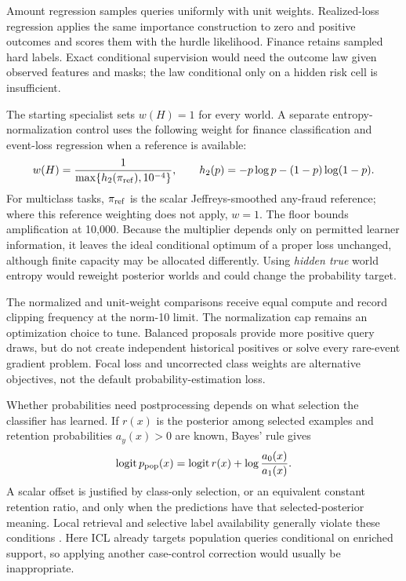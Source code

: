 \documentclass[11pt]{article}
\begin{document}
Amount regression samples queries uniformly with unit weights. Realized-loss regression applies the same importance construction to zero and positive outcomes and scores them with the hurdle likelihood. Finance retains sampled hard labels. Exact conditional supervision would need the outcome law given observed features and masks; the law conditional only on a hidden risk cell is insufficient.

The starting specialist sets $w(H)=1$ for every world. A separate entropy-normalization control uses the following weight for finance classification and event-loss regression when a reference is available:
\[
w(H)=\frac{1}{\max\{h_2(\pi_{\rm ref}),10^{-4}\}},\qquad
h_2(p)=-p\log p-(1-p)\log(1-p).
\]
For multiclass tasks, $\pi_{\rm ref}$ is the scalar Jeffreys-smoothed any-fraud reference; where this reference weighting does not apply, $w=1$. The floor bounds amplification at 10,000. Because the multiplier depends only on permitted learner information, it leaves the ideal conditional optimum of a proper loss unchanged, although finite capacity may be allocated differently. Using \emph{hidden true} world entropy would reweight posterior worlds and could change the probability target.

The normalized and unit-weight comparisons receive equal compute and record clipping frequency at the norm-10 limit. The normalization cap remains an optimization choice to tune. Balanced proposals provide more positive query draws, but do not create independent historical positives or solve every rare-event gradient problem. Focal loss and uncorrected class weights are alternative objectives, not the default probability-estimation loss.

Whether probabilities need postprocessing depends on what selection the classifier has learned. If $r(x)$ is the posterior among selected examples and retention probabilities $a_y(x)>0$ are known, Bayes' rule gives
\begin{equation}
\operatorname{logit}p_{\rm pop}(x)=\operatorname{logit}r(x)+\log\frac{a_0(x)}{a_1(x)}.
\end{equation}
A scalar offset is justified by class-only selection, or an equivalent constant retention ratio, and only when the predictions have that selected-posterior meaning. Local retrieval and selective label availability generally violate these conditions \cite{localcasecontrol}. Here ICL already targets population queries conditional on enriched support, so applying another case-control correction would usually be inappropriate.
\end{document}
